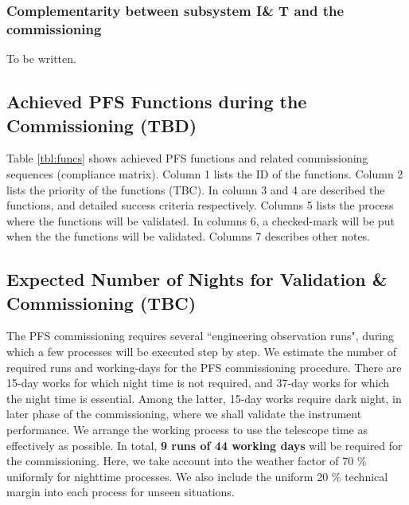 
\subsubsection{Complementarity between subsystem I\& T and the commissioning}
To be written.

\subsection{Achieved PFS Functions during the Commissioning (TBD)}\label{sec:cmatrix}
Table \ref{tbl:funcs} shows achieved PFS functions and related commissioning sequences (compliance matrix).
Column 1 lists the ID of the functions.
Column 2 lists the priority of the functions (TBC).
In column 3 and 4 are described the functions, and detailed success criteria respectively.
Columns 5 lists the process  where the functions will be validated.
In columns 6, a checked-mark will be put when the the functions will be validated.
Columns 7 describes other notes.



\subsection{Expected Number of Nights for Validation \& Commissioning (TBC)}
The PFS commissioning requires several ``engineering observation runs", during which a few processes will be executed step by step.
We estimate the number of required runs and working-days for the PFS commissioning procedure.
There are 15-day works for which night time is not required, and 37-day works for which the night time is essential.
Among the latter, 15-day works require dark night, in later phase of the commissioning, where we shall validate the instrument performance.
We arrange the working process to use the telescope time as effectively as possible.
In total, {\bf 9 runs of 44 working days} will be  required for the commissioning. 
Here, we take account into the weather factor of 70 \% uniformly  for nighttime processes.
We also include the uniform 20 \% technical margin into each process for unseen situations.

